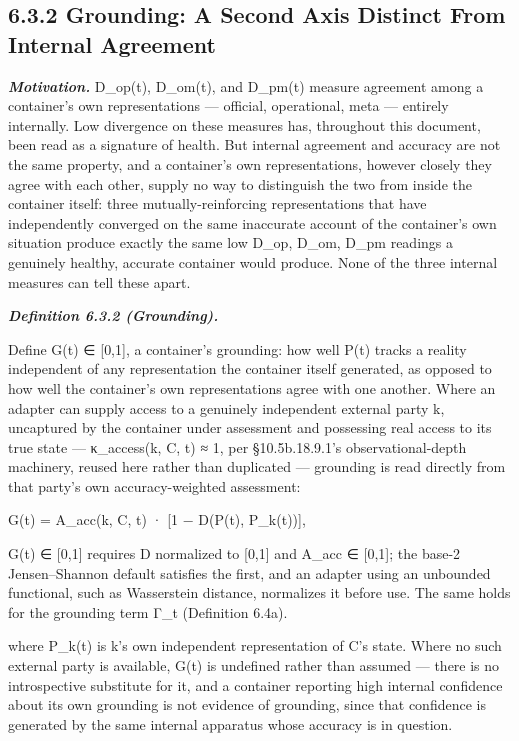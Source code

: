 \documentclass[
]{article}
\begin{document}
\hypertarget{grounding-a-second-axis-distinct-from-internal-agreement}{%
\subsection{6.3.2 Grounding: A Second Axis Distinct From Internal
Agreement}\label{grounding-a-second-axis-distinct-from-internal-agreement}}

\emph{\textbf{Motivation.}} D\_op(t), D\_om(t), and D\_pm(t) measure
agreement among a container's own representations --- official,
operational, meta --- entirely internally. Low divergence on these
measures has, throughout this document, been read as a signature of
health. But internal agreement and accuracy are not the same property,
and a container's own representations, however closely they agree with
each other, supply no way to distinguish the two from inside the
container itself: three mutually-reinforcing representations that have
independently converged on the same inaccurate account of the
container's own situation produce exactly the same low D\_op, D\_om,
D\_pm readings a genuinely healthy, accurate container would produce.
None of the three internal measures can tell these apart.

\emph{\textbf{Definition 6.3.2 (Grounding).}}

Define G(t) ∈ {[}0,1{]}, a container's grounding: how well P(t) tracks a
reality independent of any representation the container itself
generated, as opposed to how well the container's own representations
agree with one another. Where an adapter can supply access to a
genuinely independent external party k, uncaptured by the container
under assessment and possessing real access to its true state ---
κ\_access(k, C, t) ≈ 1, per §10.5b.18.9.1's observational-depth
machinery, reused here rather than duplicated --- grounding is read
directly from that party's own accuracy-weighted assessment:

G(t) = A\_acc(k, C, t) · {[}1 − D(P(t), P\_k(t)){]},

G(t) ∈ {[}0,1{]} requires D normalized to {[}0,1{]} and A\_acc ∈
{[}0,1{]}; the base-2 Jensen--Shannon default satisfies the first, and
an adapter using an unbounded functional, such as Wasserstein distance,
normalizes it before use. The same holds for the grounding term Γ\_t
(Definition 6.4a).

where P\_k(t) is k's own independent representation of C's state. Where
no such external party is available, G(t) is undefined rather than
assumed --- there is no introspective substitute for it, and a container
reporting high internal confidence about its own grounding is not
evidence of grounding, since that confidence is generated by the same
internal apparatus whose accuracy is in question.
\end{document}
